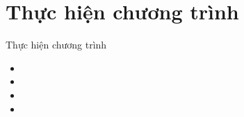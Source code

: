 \documentclass{beamer}
\numberwithin{equation}{section}
\begin{document}





\section{Thực hiện chương trình}
\begin{frame}{Thực hiện chương trình}
\begin{itemize}
\item
\item
\item
\item
\end{itemize}
\end{frame}
%
\end{document}
